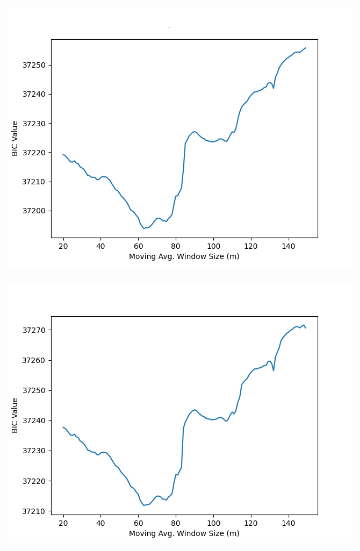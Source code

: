 \documentclass[12pt]{article}
\begin{document}
\begin{figure}[!ht]
  \begin{subfigure}[!ht]{0.45\textwidth}
    \includegraphics[width=\linewidth]{Prop_LT_Cr}
  \end{subfigure}\hfill
  \begin{subfigure}[!ht]{0.45\textwidth}
    \includegraphics[width=\linewidth]{LT_Cr}
  \end{subfigure}


\end{figure}
\end{document}
